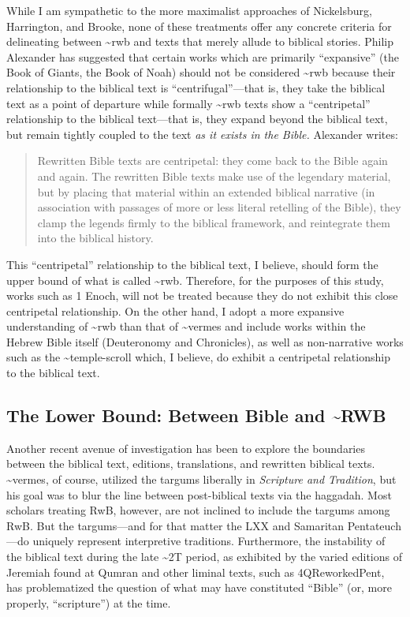 While I am sympathetic to the more maximalist approaches of Nickelsburg,
Harrington, and Brooke, none of these treatments offer any concrete
criteria for delineating between \textasciitilde{}rwb and texts that
merely allude to biblical stories. Philip Alexander has suggested that
certain works which are primarily ``expansive'' (the Book of Giants, the
Book of Noah) should not be considered \textasciitilde{}rwb because
their relationship to the biblical text is ``centrifugal''---that is,
they take the biblical text as a point of departure while formally
\textasciitilde{}rwb texts show a ``centripetal'' relationship to the
biblical text---that is, they expand beyond the biblical text, but
remain tightly coupled to the text \emph{as it exists in the Bible.}
Alexander writes:

\begin{quote}
Rewritten Bible texts are centripetal: they come back to the Bible again
and again. The rewritten Bible texts make use of the legendary material,
but by placing that material within an extended biblical narrative (in
association with passages of more or less literal retelling of the
Bible), they clamp the legends firmly to the biblical framework, and
reintegrate them into the biblical history.
\autocite[117]{alexander_carson-williamson1988}
\end{quote}

This ``centripetal'' relationship to the biblical text, I believe,
should form the upper bound of what is called \textasciitilde{}rwb.
Therefore, for the purposes of this study, works such as 1 Enoch, will
not be treated because they do not exhibit this close centripetal
relationship. On the other hand, I adopt a more expansive understanding
of \textasciitilde{}rwb than that of \textasciitilde{}vermes and include
works within the Hebrew Bible itself (Deuteronomy and Chronicles), as
well as non-narrative works such as the \textasciitilde{}temple-scroll
which, I believe, do exhibit a centripetal relationship to the biblical
text.

\hypertarget{the-lower-bound-between-bible-and-rwb}{%
\subsection{The Lower Bound: Between Bible and
\textasciitilde{}RWB}\label{the-lower-bound-between-bible-and-rwb}}

Another recent avenue of investigation has been to explore the
boundaries between the biblical text, editions, translations, and
rewritten biblical texts. \textasciitilde{}vermes, of course, utilized
the targums liberally in \emph{Scripture and Tradition}, but his goal
was to blur the line between post-biblical texts via the haggadah. Most
scholars treating RwB, however, are not inclined to include the targums
among RwB. But the targums---and for that matter the LXX and Samaritan
Pentateuch---do uniquely represent interpretive traditions. Furthermore,
the instability of the biblical text during the late \textasciitilde{}2T
period, as exhibited by the varied editions of Jeremiah found at Qumran
and other liminal texts, such as 4QReworkedPent, has problematized the
question of what may have constituted ``Bible'' (or, more properly,
``scripture'') at the time.

